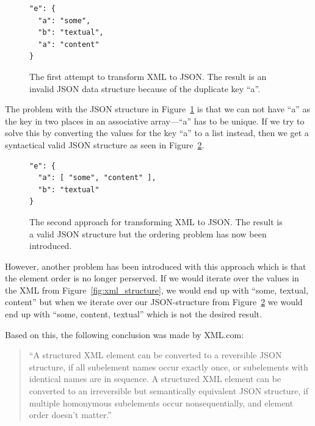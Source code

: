 \documentclass{cslthse-msc}
\begin{document}
\begin{figure}[H]
  \centering
    \begin{center}
\begin{lstlisting}[breaklines=true,frame=single]
"e": {
  "a": "some",
  "b": "textual",
  "a": "content"
}
\end{lstlisting}
    \end{center}
  \caption{The first attempt to transform XML to JSON. The result is an invalid JSON data structure because of the duplicate key \enquote{a}.}
  \label{fig:xml_wrong}
\end{figure}

The problem with the JSON structure in Figure~\ref{fig:xml_wrong} is that we can not have \enquote{a} as the key in two places in an associative array---\enquote{a} has to be unique. If we try to solve this by converting the values for the key \enquote{a} to a list instead, then we get a syntactical valid JSON structure as seen in Figure~\ref{fig:json_wrong}.

\begin{figure}[H]
  \centering
    \begin{center}
\begin{lstlisting}[breaklines=true,frame=single]
"e": {
  "a": [ "some", "content" ],
  "b": "textual"
}
\end{lstlisting}
    \end{center}
  \caption{The second approach for transforming XML to JSON. The result is a valid JSON structure but the ordering problem has now been introduced.}
  \label{fig:json_wrong}
\end{figure}

However, another problem has been introduced with this approach which is that the element order is no longer perserved. If we would iterate over the values in the XML from Figure~\ref{fig:xml_structure}, we would end up with \enquote{some, textual, content} but when we iterate over our JSON-structure from Figure~\ref{fig:json_wrong} we would end up with \enquote{some, content, textual} which is not the desired result.

\vspace{5mm}
\noindent Based on this, the following conclusion was made by XML.com:

\begin{quote}

\enquote{A structured XML element can be converted to a reversible JSON structure, if all subelement names occur exactly once, or subelements with identical names are in sequence. A structured XML element can be converted to an irreversible but semantically equivalent JSON structure, if multiple homonymous subelements occur nonsequentially, and element order doesn't matter.}  \cite{xml_json}

\end{quote}
\end{document}
